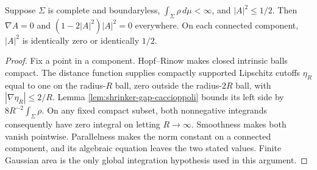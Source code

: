 \begin{proposition}\label{prop:shrinker-gap-parallel}
Suppose $\Sigma$ is complete and boundaryless, $\int_\Sigma\rho\,d\mu<\infty$, and $|A|^2\leq1/2$. Then $\nabla A=0$ and $(1-2|A|^2)|A|^2=0$ everywhere. On each connected component, $|A|^2$ is identically zero or identically $1/2$.
\end{proposition}
\begin{proof}
Fix a point in a component. Hopf--Rinow makes closed intrinsic balls compact. The distance function supplies compactly supported Lipschitz cutoffs $\eta_R$ equal to one on the radius-$R$ ball, zero outside the radius-$2R$ ball, with $|\nabla\eta_R|\leq2/R$. Lemma \ref{lem:shrinker-gap-caccioppoli} bounds its left side by $8R^{-2}\int_\Sigma\rho$. On any fixed compact subset, both nonnegative integrands consequently have zero integral on letting $R\to\infty$. Smoothness makes both vanish pointwise. Parallelness makes the norm constant on a connected component, and its algebraic equation leaves the two stated values. Finite Gaussian area is the only global integration hypothesis used in this argument.
\end{proof}

